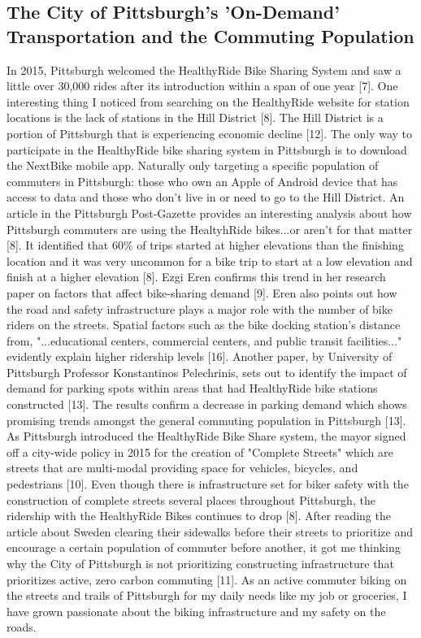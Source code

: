 \documentclass[letterpaper, 12 pt, conference]{ieeeconf}  %
\begin{document}
\subsection{The City of Pittsburgh's 'On-Demand' Transportation and the Commuting Population }
	In 2015, Pittsburgh welcomed the HealthyRide Bike Sharing System and saw a little over 30,000 rides after its introduction within a span of one year [7]. One interesting thing I noticed from searching on the HealthyRide website for station locations is the lack of stations in the Hill District [8]. The Hill District is a portion of Pittsburgh that is experiencing economic decline [12]. The only way to participate in the HealthyRide bike sharing system in Pittsburgh is to download the NextBike mobile app. Naturally only targeting a specific population of commuters in Pittsburgh: those who own an Apple of Android device that has access to data and those who don't live in or need to go to the Hill District.
	\newline 
	An article in the Pittsburgh Post-Gazette provides an interesting analysis about how Pittsburgh commuters are using the HealtyhRide bikes...or aren't for that matter [8]. It identified that 60\% of trips started at higher elevations than the finishing location and it was very uncommon for a bike trip to start at a low elevation and finish at a higher elevation [8]. Ezgi Eren confirms this trend in her research paper on factors that affect bike-sharing demand [9]. Eren also points out how the road and safety infrastructure plays a major role with the number of bike riders on the streets. Spatial factors such as the bike docking station's distance from, "...educational centers, commercial centers, and public transit facilities..." evidently explain higher ridership levels [16]. Another paper, by University of Pittsburgh Professor Konstantinos Pelechrinis, sets out to identify the impact of demand for parking spots within areas that had HealthyRide bike stations constructed [13]. The results confirm a decrease in parking demand which shows promising trends amongst the general commuting population in Pittsburgh [13]. 
	\newline
	As Pittsburgh introduced the HealthyRide Bike Share system, the mayor signed off a city-wide policy in 2015 for the creation of "Complete Streets" which are streets that are multi-modal providing space for vehicles, bicycles, and pedestrians [10]. Even though there is infrastructure set for biker safety with the construction of complete streets several places throughout Pittsburgh, the ridership with the HealthyRide Bikes continues to drop [8]. After reading the article about Sweden clearing their sidewalks before their streets to prioritize and encourage a certain population of commuter before another, it got me thinking why the City of Pittsburgh is not prioritizing constructing infrastructure that prioritizes active, zero carbon commuting [11]. As an active commuter biking on the streets and trails of Pittsburgh for my daily needs like my job or groceries, I have grown passionate about the biking infrastructure and my safety on the roads. 
\end{document}
